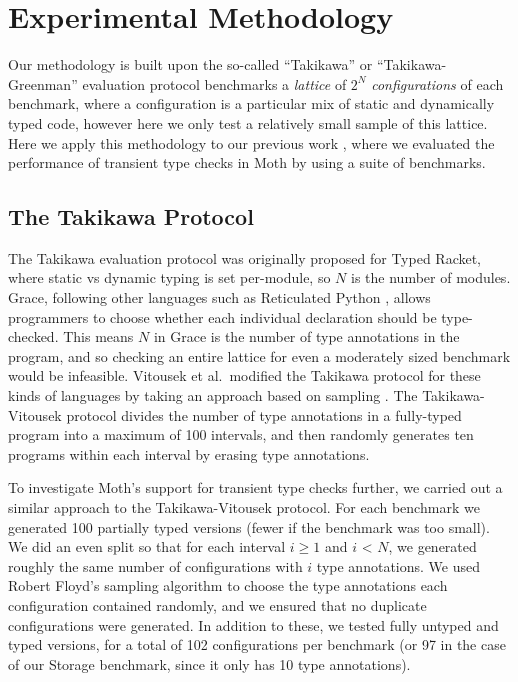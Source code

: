 \documentclass[sigplan,10pt,review,screen]{acmart}\settopmatter{printfolios=true}
\begin{document}
\section{Experimental Methodology}
Our methodology is built upon the so-called ``Takikawa'' or ``Takikawa-Greenman'' evaluation protocol \cite{Takikawa2016,Greenman2019jfp} benchmarks a \emph{lattice} of $2^N$ \emph{configurations} of each benchmark, where a configuration is a particular mix of static and dynamically typed code, however here we only test a relatively small sample of this lattice. Here we apply this methodology to our previous work \cite{roberts-and-co-ecoop-2019}, where we evaluated the performance of transient type checks in Moth by using a suite of benchmarks.

\subsection{The Takikawa Protocol}
The Takikawa evaluation protocol was originally proposed for Typed
Racket, where static vs dynamic typing is set per-module, so $N$ is
the number of modules. Grace, following other languages such as
Reticulated Python \cite{reticPython2014,monotonic2015,Vitousek2017},
allows programmers to choose whether each individual declaration should be type-checked. This means $N$ in Grace is the number of type annotations in the program, and so
checking an entire lattice for even a moderately sized benchmark would be infeasible.  Vitousek et al.\ modified the Takikawa protocol for
these kinds of languages by taking an approach based on sampling
\cite{vitousek-transient-arXive-2019}.  The Takikawa-Vitousek protocol
divides the number of type annotations in a fully-typed program into
a maximum of 100 intervals, and then randomly generates ten programs within
each interval by erasing type annotations.

To investigate Moth's support for transient type checks further, we carried out a similar approach to the Takikawa-Vitousek protocol. For each benchmark we generated 100 partially typed versions (fewer if the benchmark was too small). We did an even split so that for each interval $i \ge 1$ and $i$ < $N$, we generated roughly the same number of configurations with $i$ type annotations. We used Robert Floyd's sampling algorithm \cite{Bentley:1987:PPS:30401.315746} to choose the type annotations each configuration contained randomly, and we ensured that no duplicate configurations were generated. In addition to these, we tested fully untyped and typed versions, for a total of 102 configurations per benchmark (or 97 in the case of our Storage benchmark, since it only has 10 type annotations).
\end{document}
